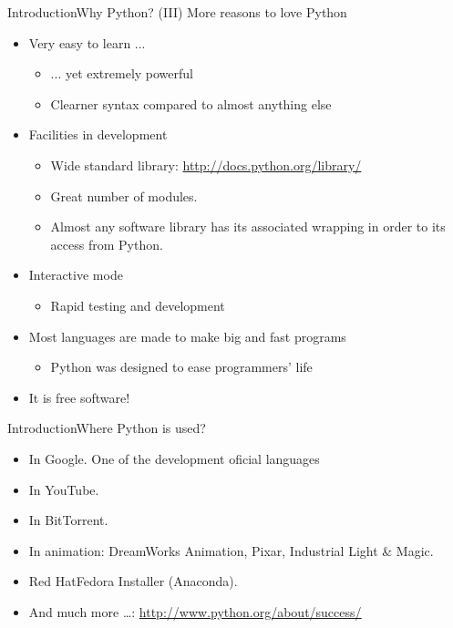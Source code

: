 \documentclass[10pt,compress]{beamer} %
\begin{document}
\begin{frame}{Introduction}{Why Python? (III)}
	More reasons to love Python
	\begin{itemize}
	\item Very easy to learn ...
	\begin{itemize}
		\item ... yet extremely powerful
		\item  Clearner syntax compared to almost anything else
	\end{itemize}
	\item Facilities in development
	\begin{itemize}
	\item \small{Wide standard library: \url{http://docs.python.org/library/}}
    \item \small{Great number of modules.}
   \item \small{Almost any software library has its associated wrapping in order to its access from Python.}
   \end{itemize}
	\item Interactive mode
	\begin{itemize}
		\item Rapid testing and development
	\end{itemize}
	\item Most languages are made to make big and fast programs
	\begin{itemize}
		\item Python was designed to ease programmers' life
	\end{itemize}
	\item It is free software!
	\end{itemize}
\end{frame}

\begin{frame}{Introduction}{Where Python is used?}
	
	\begin{itemize}
	\item In Google. One of the development oficial languages
	
	\item In YouTube.
	
	\item In BitTorrent.
	
	\item In animation: DreamWorks Animation, Pixar, Industrial Light \& Magic.
	\item Red Hat\/Fedora Installer  (Anaconda).
	\item And much more \ldots : \url{http://www.python.org/about/success/}
	\end{itemize}
\end{frame}
\end{document}
